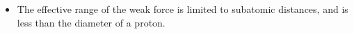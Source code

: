 \documentclass{scrreprt} %
\begin{document}
\begin{itemize}
	\item The effective range of the weak force is limited to subatomic
	distances, and is less than the diameter of a proton.
\end{itemize}




	







\end{document}

